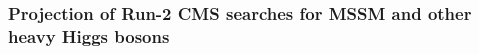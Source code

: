 \subsubsection{Projection of Run-2 CMS searches for MSSM and other heavy Higgs bosons}


\newcommand{\GeV}{\ensuremath{\text{GeV}\xspace}}
\newcommand{\TeV}{\ensuremath{\text{TeV}\xspace}}






